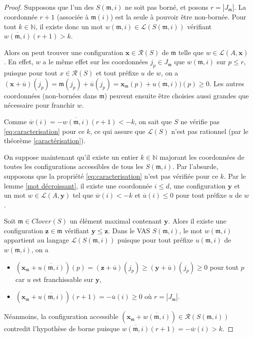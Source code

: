 \documentclass[a4paper,final]{article}
\theoremstyle{definition}
\let\leq\leqslant
\let\geq\geqslant
\newcommand{\N}{\ensuremath{\mathbb{N}}}
\newcommand{\card}[1]{|#1|}
\newcommand{\lang}{\ensuremath{\mathcal{L}}}
\newcommand{\reach}{\ensuremath{\mathcal{R}}}
\newcommand{\clover}{\textit{Clover}}
\newcommand{\vect}[1]{\ensuremath{\mathbf{#1}}}
\newcommand{\valeur}[1]{\ensuremath{\overline{#1}}}
\begin{document}
\begin{proof}
Supposons que l'un des $S(\mathfrak{m},i)$ ne soit pas borné, et posons $r = \card{J_\mathfrak{m}}$.
La coordonnée $r+1$ (associée à $\mathfrak{m}(i)$) est la seule à pouvoir être non-bornée.
Pour tout $k\in\N$, il existe donc un mot $w(\mathfrak{m},i) \in \lang(S(\mathfrak{m},i))$ vérifiant $\valeur{w(\mathfrak{m},i)}(r+1) >k$.

Alors on peut trouver une configuration $\vect{x}\in\reach(S)$ de $\mathfrak{m}$ telle que $w\in\lang(A,\vect{x})$.
En effet, $w$ a le même effet sur les coordonnées $j_p \in J_\mathfrak{m}$ que $w(\mathfrak{m},i)$ sur $p\leq r$,
puisque pour tout $x\in\reach(S)$ et tout préfixe $u$ de $w$, on a
$(\vect{x} +\valeur{u})(j_p) = 
\mathfrak{m}(j_p) +\valeur{u}(j_p) = 
\vect{x}_\mathfrak{m}(p) +\valeur{u(\mathfrak{m},i)})(p) \geq 0$.
Les autres coordonnées (non-bornées dans $\mathfrak{m}$) peuvent ensuite être choisies aussi grandes que nécessaire pour franchir $w$.

Comme $\valeur{w}(i) = -\valeur{w(\mathfrak{m},i)}(r+1) < -k$, on sait que $S$ ne vérifie pas \eqref{eq:caracterisation} pour ce $k$, 
ce qui assure que $\lang(S)$ n'est pas rationnel (par le théorème \ref{caractérisation}).

\vspace{3mm}
On suppose maintenant qu'il existe un entier $k\in\N$ majorant les coordonnées de toutes les configurations accessibles de tous les $S(\mathfrak{m},i)$.
Par l'absurde, supposons que la propriété \eqref{eq:caracterisation} n'est pas vérifiée pour ce $k$.
Par le lemme \ref{mot décroissant}, il existe une coordonnée $i\leq d$, une configuration $\vect{y}$ et un mot $w\in \lang(A,\vect{y})$ tel que  $\valeur{w}(i) < -k$ et $\valeur{u}(i) \leq 0$ pour tout préfixe $u$ de $w$.

Soit $\mathfrak{m} \in\clover(S)$ un élément maximal contenant $\vect{y}$.
Alors il existe une configuration $\vect{z}\in\mathfrak{m}$ vérifiant $\vect{y} \leq \vect{z}$.
Dans le VAS $S(\mathfrak{m},i)$, le mot $w(\mathfrak{m},i)$ appartient au langage $\lang(S(\mathfrak{m},i))$ 
puisque pour tout préfixe $u(\mathfrak{m},i)$ de $w(\mathfrak{m},i)$, on a 
\begin{itemize}
    \item $(\vect{x}_\mathfrak{m} +\valeur{u (\mathfrak{m},i)} )(p) = (\vect{z} +\valeur{u})(j_p) \geq (\vect{y} +\valeur{u})(j_p) \geq 0$ pour tout $p$ car $u$ est franchissable sur $\vect{y}$,
    \item $(\vect{x}_\mathfrak{m} +\valeur{u (\mathfrak{m},i)} )(r+1) = -\valeur{u}(i) \geq 0$ où $r = \card{J_\mathfrak{m}}$.
\end{itemize}
Néanmoins, la configuration accessible $(\vect{x}_\mathfrak{m} + \valeur{w(\mathfrak{m},i)}) \in \reach(S(\mathfrak{m},i))$ contredit l'hypothèse de borne puisque $\valeur{w(\mathfrak{m},i)}(r+1) = -\valeur{w}(i) > k$.

\end{proof}
\end{document}
